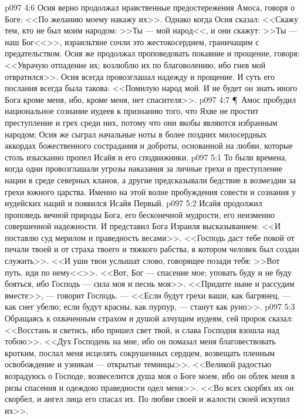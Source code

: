\vs p097 4:6 Осия верно продолжал нравственные предостережения Амоса, говоря о Боге: <<По желанию моему накажу их>>. Однако когда Осия сказал: <<Скажу тем, кто не был моим народом: >>Ты --- мой народ<<, и они скажут: >>Ты --- наш Бог<<>>, израильтяне сочли это жестокосердием, граничащим с предательством. Осия же продолжал проповедовать покаяние и прощение, говоря: <<Уврачую отпадение их; возлюблю их по благоволению, ибо гнев мой отвратился>>. Осия всегда провозглашал надежду и прощение. И суть его послания всегда была такова: <<Помилую народ мой. И не будет он знать иного Бога кроме меня, ибо, кроме меня, нет спасителя>>.
\vs p097 4:7 \P\ Амос пробудил национальное сознание иудеев к признанию того, что Яхве не простит преступление и грех среди них, потому что они якобы являются избранным народом; Осия же сыграл начальные ноты в более поздних милосердных аккордах божественного сострадания и доброты, основанной на любви, которые столь изысканно пропел Исайя и его сподвижники.
\vs p097 5:1 То были времена, когда одни провозглашали угрозы наказания за личные грехи и преступление нации в среде северных кланов, а другие предсказывали бедствие в возмездии за грехи южного царства. Именно на этой волне пробуждения совести и сознания у иудейских наций и появился Исайя Первый.
\vs p097 5:2 Исайя продолжил проповедь вечной природы Бога, его бесконечной мудрости, его неизменно совершенной надежности. И представил Бога Израиля высказыванием: <<И поставлю суд мерилом и праведность весами>>. <<Господь даст тебе покой от печали твоей и от страха твоего и тяжкого рабства, в котором человек был создан служить>>. <<И уши твои услышат слово, говорящее позади тебя: >>Вот путь, иди по нему<<>>. <<Вот, Бог --- спасение мое; уповать буду и не буду бояться, ибо Господь --- сила моя и песнь моя>>. <<Придите ныне и рассудим вместе>>, --- говорит Господь. --- <<Если будут грехи ваши, как багрянец, --- как снег убелю; если будут красны, как пурпур, --- станут как руно>>.
\vs p097 5:3 Обращаясь к охваченным страхом и душой алчущим иудеям, сей пророк сказал: <<Восстань и светись, ибо пришел свет твой, и слава Господня взошла над тобою>>. <<Дух Господень на мне, ибо он помазал меня благовествовать кротким, послал меня исцелять сокрушенных сердцем, возвещать пленным освобождение и узникам --- открытые темницы>>. <<Великой радостью возрадуюсь о Господе, возвеселится душа моя о Боге моем, ибо он облек меня в ризы спасения и одеждою праведности одел меня>>. <<Во всех скорбях их он скорбел, и ангел лица его спасал их. По любви своей и жалости своей искупил их>>.
